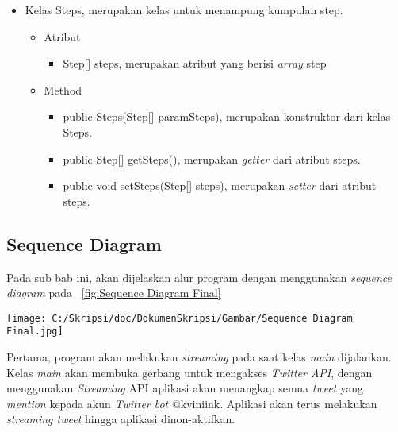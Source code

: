 \begin{itemize}
		\item Kelas Steps, merupakan kelas untuk menampung kumpulan step.
		
		
				\begin{itemize}
							\item Atribut
					
					
									\begin{itemize}
												\item Step[] steps, merupakan atribut yang berisi \textit{array} step
									\end{itemize}
					
							\item Method
					
					
									\begin{itemize}
												\item public Steps(Step[] paramSteps), merupakan konstruktor dari kelas Steps.
												\item public Step[] getSteps(), merupakan \textit{getter} dari atribut steps.
												\item public void setSteps(Step[] steps), merupakan \textit{setter} dari atribut steps.
									\end{itemize}
				\end{itemize}
\end{itemize}




\subsection{Sequence Diagram}

Pada sub bab ini, akan dijelaskan alur program dengan menggunakan \textit{sequence diagram} pada ~\ref{fig:Sequence Diagram Final}

\begin{sidewaysfigure}[htbp]
	\centering
		\texttt{[image: C:/Skripsi/doc/DokumenSkripsi/Gambar/Sequence Diagram Final.jpg]}
	\caption{Sequence Diagram \textit{Twitter bot} untuk Mencari Jalur Transportasi Publik}
	\label{fig:Sequence Diagram Final}
\end{sidewaysfigure}


Pertama, program akan melakukan \textit{streaming} pada saat kelas \textit{main} dijalankan. Kelas \textit{main} akan membuka gerbang untuk mengakses \textit{Twitter API}, dengan menggunakan \textit{Streaming} API aplikasi akan menangkap semua \textit{tweet} yang \textit{mention} kepada akun \textit{Twitter bot} @kviniink. Aplikasi akan terus melakukan \textit{streaming tweet} hingga aplikasi dinon-aktifkan.

